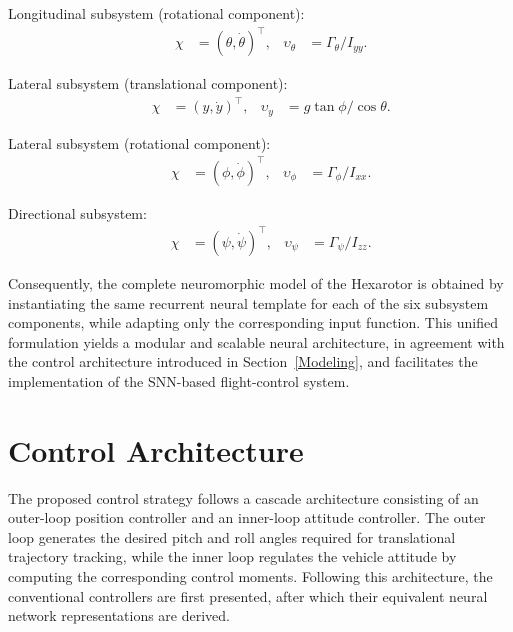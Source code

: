 \documentclass[conference]{IEEEtran}
\begin{document}
Longitudinal subsystem (rotational component):
\begin{equation*}
\begin{aligned}
& & \chi&=(\theta,\dot\theta)^\top, & \upsilon_\theta&=\Gamma_\theta/I_{yy}.
\end{aligned}
\end{equation*}

Lateral subsystem (translational component):
\begin{equation*}
\begin{aligned}
& & \chi&=(y,\dot y)^\top, & \upsilon_y&=g\tan\phi/\cos\theta.
\end{aligned}
\end{equation*}

Lateral subsystem (rotational component):
\begin{equation*}
\begin{aligned}
& & \chi&=(\phi,\dot\phi)^\top, & \upsilon_\phi&=\Gamma_\phi/I_{xx}.
\end{aligned}
\end{equation*}

Directional subsystem:
\begin{equation*}
\begin{aligned}
& & \chi&=(\psi,\dot\psi)^\top, & \upsilon_\psi&=\Gamma_\psi/I_{zz}.
\end{aligned}
\end{equation*}

Consequently, the complete neuromorphic model of the Hexarotor is obtained by instantiating the same recurrent neural template for each of the six subsystem components, while adapting only the corresponding input function. This unified formulation yields a modular and scalable neural architecture, in agreement with the control architecture introduced in Section~\ref{Modeling}, and facilitates the implementation of the SNN-based flight-control system.


\section{Control Architecture}\label{Control}



The proposed control strategy follows a cascade architecture consisting of an outer-loop position controller and an inner-loop attitude controller. The outer loop generates the desired pitch and roll angles required for translational trajectory tracking, while the inner loop regulates the vehicle attitude by computing the corresponding control moments. Following this architecture, the conventional controllers are first presented, after which their equivalent neural network representations are derived.
\end{document}
